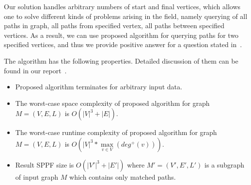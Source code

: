%

Our solution handles arbitrary numbers of start and final vertices, which allows one to solve different kinds of problems arising in the field, namely querying of all paths in graph, all paths from specified vertex, all paths between specified vertices. As a result, we can use proposed algorithm for querying paths for two specified vertices, and thus we provide positive answer for a question stated in~\cite{Hellings16}. 

The algorithm has the following properties. Detailed discussion of them can be found in our report~\cite{GrigorevR16}.
\begin{itemize} 
\item Proposed algorithm terminates for arbitrary input data.
\item The worst-case space complexity of proposed algorithm for graph $M=(V,E,L)$ is $O(|V|^3 + |E|)$.
\item The worst-case runtime complexity of proposed algorithm for graph $M=(V,E,L)$ is $O\left(|V|^3*\max\limits_{v \in V}\left(deg^+\left(v\right)\right)\right).$
\item Result SPPF size is $O(|V'|^3 + |E'|)$ where $M'=(V',E',L')$ is a subgraph of input graph $M$ which contains only matched paths.
\end{itemize}
